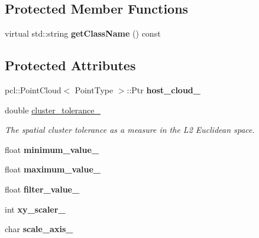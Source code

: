 \subsection*{Protected Member Functions}
\begin{DoxyCompactItemize}
\item 
\mbox{\label{classpcl__gpu_1_1FilterPassThrough_ab0bdb9699482e82b224600dafb5db213}} 
virtual std\+::string {\bfseries get\+Class\+Name} () const
\end{DoxyCompactItemize}
\subsection*{Protected Attributes}
\begin{DoxyCompactItemize}
\item 
\mbox{\label{classpcl__gpu_1_1FilterPassThrough_ae97a0763019c72d7c374f620be683879}} 
pcl\+::\+Point\+Cloud$<$ Point\+Type $>$\+::Ptr {\bfseries host\+\_\+cloud\+\_\+}
\item 
\mbox{\label{classpcl__gpu_1_1FilterPassThrough_a19c2da4a53d83f595fcc689b5cc6dde8}} 
double \hyperlink{classpcl__gpu_1_1FilterPassThrough_a19c2da4a53d83f595fcc689b5cc6dde8}{cluster\+\_\+tolerance\+\_\+}
\begin{DoxyCompactList}\small\item\em The spatial cluster tolerance as a measure in the L2 Euclidean space. \end{DoxyCompactList}\item 
\mbox{\label{classpcl__gpu_1_1FilterPassThrough_a2f58b77770e7436abe4ed133b332b3fe}} 
float {\bfseries minimum\+\_\+value\+\_\+}
\item 
\mbox{\label{classpcl__gpu_1_1FilterPassThrough_ae17fd13dd9b980baf5996ecb40b580c9}} 
float {\bfseries maximum\+\_\+value\+\_\+}
\item 
\mbox{\label{classpcl__gpu_1_1FilterPassThrough_a0ab936425b9c8bc26aeb322f66424079}} 
float {\bfseries filter\+\_\+value\+\_\+}
\item 
\mbox{\label{classpcl__gpu_1_1FilterPassThrough_a06b3486b01c309c100fedae2c0ee96e2}} 
int {\bfseries xy\+\_\+scaler\+\_\+}
\item 
\mbox{\label{classpcl__gpu_1_1FilterPassThrough_a664daefca49b3b3b930c63e945dbc64c}} 
char {\bfseries scale\+\_\+axis\+\_\+}
\end{DoxyCompactItemize}


